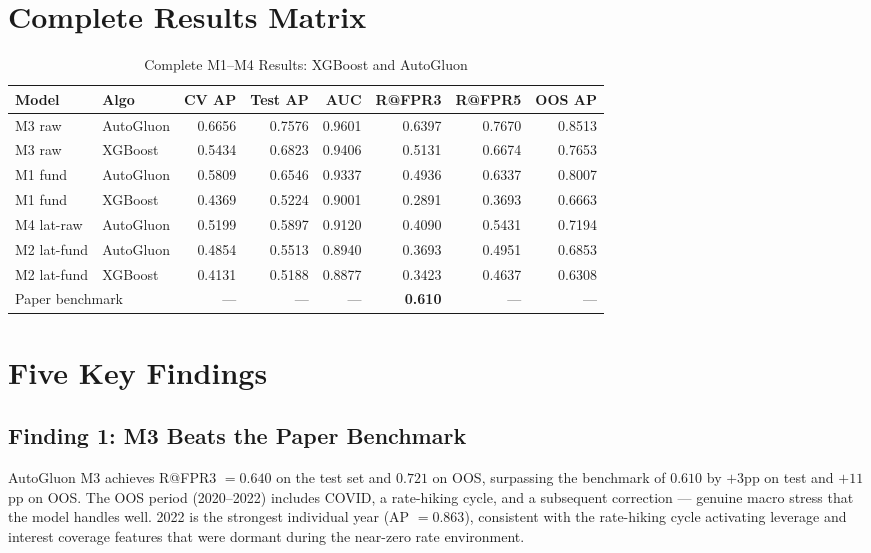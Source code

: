 \documentclass{report}\usepackage[]{graphicx}\usepackage[table]{xcolor}
\begin{document}
\section{Complete Results Matrix}

\begin{table}[H]
\centering
\caption{Complete M1--M4 Results: XGBoost and AutoGluon}
\begin{tabular}{llrrrrrr}
\toprule
\textbf{Model} & \textbf{Algo} & \textbf{CV AP} & \textbf{Test AP} & \textbf{AUC} & \textbf{R@FPR3} & \textbf{R@FPR5} & \textbf{OOS AP} \\
\midrule
M3 raw     & AutoGluon & 0.6656 & 0.7576 & 0.9601 & 0.6397 & 0.7670 & 0.8513 \\
M3 raw     & XGBoost   & 0.5434 & 0.6823 & 0.9406 & 0.5131 & 0.6674 & 0.7653 \\
\midrule
M1 fund    & AutoGluon & 0.5809 & 0.6546 & 0.9337 & 0.4936 & 0.6337 & 0.8007 \\
M1 fund    & XGBoost   & 0.4369 & 0.5224 & 0.9001 & 0.2891 & 0.3693 & 0.6663 \\
\midrule
M4 lat-raw & AutoGluon & 0.5199 & 0.5897 & 0.9120 & 0.4090 & 0.5431 & 0.7194 \\
\midrule
M2 lat-fund & AutoGluon & 0.4854 & 0.5513 & 0.8940 & 0.3693 & 0.4951 & 0.6853 \\
M2 lat-fund & XGBoost   & 0.4131 & 0.5188 & 0.8877 & 0.3423 & 0.4637 & 0.6308 \\
\midrule
\multicolumn{2}{l}{Paper benchmark \citep{Tewari2024}} & — & — & — & \textbf{0.610} & — & — \\
\bottomrule
\end{tabular}
\end{table}

\section{Five Key Findings}

\subsection{Finding 1: M3 Beats the Paper Benchmark}

AutoGluon M3 achieves R@FPR3 $= 0.640$ on the test set and $0.721$ on OOS, 
surpassing the \citet{Tewari2024} benchmark of $0.610$ by $+3$pp on test and $+11$pp on OOS. 
The OOS period (2020--2022) includes COVID, a rate-hiking cycle, and a subsequent correction — 
genuine macro stress that the model handles well. 2022 is the strongest individual year 
(AP $= 0.863$), consistent with the rate-hiking cycle activating leverage and interest 
coverage features that were dormant during the near-zero rate environment.
\end{document}
